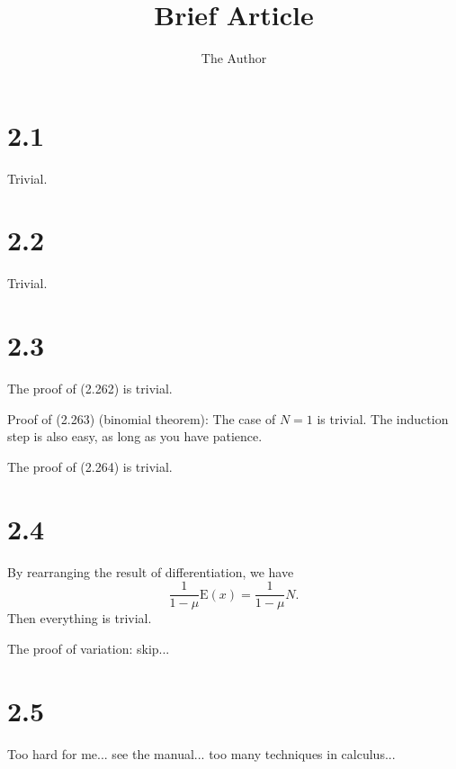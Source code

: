\documentclass[12pt]{article}
\title{Brief Article}
\author{The Author}
\begin{document}
\maketitle




\section{2.1}
Trivial.

\section{2.2}
Trivial.

\section{2.3}
The proof of (2.262) is trivial.

Proof of (2.263) (binomial theorem): The case of $N=1$ is trivial. The induction step is also easy, as long as you have patience.

The proof of (2.264) is trivial.

\section{2.4}
By rearranging the result of differentiation, we have
\begin{equation}
    \frac{1}{1-\mu} \mathrm{E}(x)=\frac{1}{1-\mu} N.
\end{equation}
Then everything is trivial.

The proof of variation: skip...

\section{2.5}
Too hard for me... see the manual... too many techniques in calculus...
\end{document}
